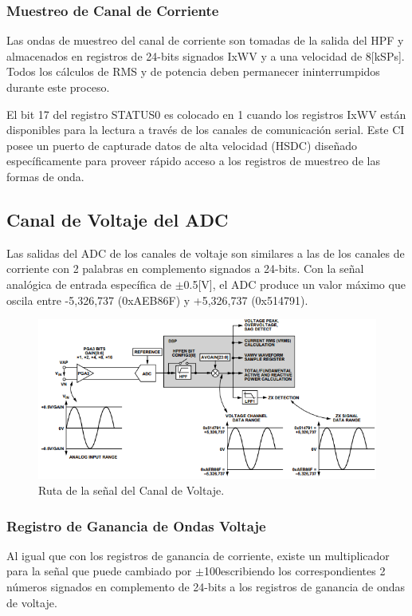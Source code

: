 \documentclass[letterpaper,12pt,oneside]{book}
\begin{document}
				\subsubsection{Muestreo de Canal de Corriente}
				Las ondas de muestreo del canal de corriente son tomadas de la salida del HPF y almacenados en registros de 24-bits signados IxWV y a una velocidad de 8[kSPs]. Todos los cálculos de RMS y de potencia deben permanecer ininterrumpidos durante este proceso.

				El bit 17 del registro STATUS0 es colocado en 1 cuando los registros IxWV están disponibles para la lectura a través de los canales de comunicación serial. Este CI posee un puerto de capturade datos de alta velocidad (HSDC) diseñado específicamente para proveer rápido acceso a los registros de muestreo de las formas de onda.

			\subsection{Canal de Voltaje del ADC}
			Las salidas del ADC de los canales de voltaje son similares a las de los canales de corriente con 2 palabras en complemento signados a 24-bits. Con la señal analógica de entrada específica de $\pm$0.5[V], el ADC produce un valor máximo que oscila entre -5,326,737 (0xAEB86F) y +5,326,737 (0x514791).

			\begin{figure}[!htpb]
				\centering
				\includegraphics[scale = 0.8]{Material de Consulta/CanalVoltaje.PNG}
				\caption[Canal de Voltaje]{Ruta de la señal del Canal de Voltaje.}
				\label{CnlVoltADC}
			\end{figure}

				\subsubsection{Registro de Ganancia de Ondas Voltaje}
				Al igual que con los registros de ganancia de corriente, existe un multiplicador para la señal que puede cambiado por $\pm$100escribiendo los correspondientes 2 números signados en complemento de 24-bits a los registros de ganancia de ondas de voltaje.
\end{document}
